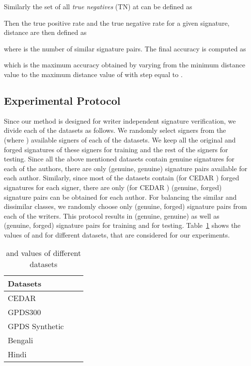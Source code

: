 \documentclass[times,twocolumn,final]{elsarticle}
\newcommand{\tab}[1]{Table~\ref{#1}}
\begin{document}
Similarly the set of all \emph{true negatives} (TN) at  can be defined as

Then the true positive rate  and the true negative rate  for a given signature, distance  are then defined as

where  is the number of similar signature pairs.
The final accuracy is computed as

which is the maximum accuracy obtained by varying  from the minimum distance value to the maximum distance value of  with step equal to .

\subsection{Experimental Protocol}
 
Since our method is designed for writer independent signature verification, we divide each of the datasets as follows. We randomly select  signers from the  (where ) available signers of each of the datasets. We keep all the original and forged signatures of these  signers for training and the rest of the  signers for testing. Since all the above mentioned datasets contain  genuine signatures for each of the authors, there are only  (genuine, genuine) signature pairs available for each author. Similarly, since most of the datasets contain  (for CEDAR ) forged signatures for each signer, there are only  (for CEDAR ) (genuine, forged) signature pairs can be obtained for each author. For balancing the similar and dissimilar classes, we randomly choose only  (genuine, forged) signature pairs from each of the writers. This protocol results in  (genuine, genuine) as well as (genuine, forged) signature pairs for training and  for testing. \tab{tab:K_M} shows the values of  and  for different datasets, that are considered for our experiments.

\begin{table}[!htb]
\caption{ and  values of different datasets}
\label{tab:K_M}
\begin{center}
\begin{tabular}{ l c c }
\hline
Datasets &  &  \\
\hline
CEDAR &  &  \\
GPDS300 &  &  \\
GPDS Synthetic &  &  \\
Bengali &  &  \\
Hindi &  &  \\
\hline
\end{tabular}
\end{center}
\end{table}
\end{document}
